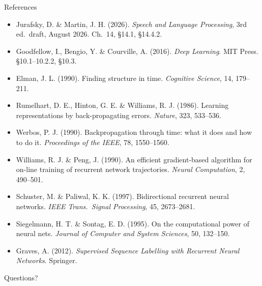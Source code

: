 \documentclass[aspectratio=169, 11pt]{beamer}
\newcommand{\nosrc}{}       %
\begin{document}
\begin{frame}[allowframebreaks]{References}
  {\scriptsize
  \begin{itemize}\itemsep0.3em
    \item Jurafsky, D. \& Martin, J. H. (2026). \emph{Speech and Language
          Processing}, 3rd ed.\ draft, August 2026. Ch.~14, \S14.1, \S14.4.2.
    \item Goodfellow, I., Bengio, Y. \& Courville, A. (2016). \emph{Deep
          Learning}. MIT Press. \S10.1--10.2.2, \S10.3.
    \item Elman, J. L. (1990). Finding structure in time. \emph{Cognitive
          Science}, 14, 179--211.
    \item Rumelhart, D. E., Hinton, G. E. \& Williams, R. J. (1986). Learning
          representations by back-propagating errors. \emph{Nature}, 323,
          533--536.
    \item Werbos, P. J. (1990). Backpropagation through time: what it does
          and how to do it. \emph{Proceedings of the IEEE}, 78, 1550--1560.
    \item Williams, R. J. \& Peng, J. (1990). An efficient gradient-based
          algorithm for on-line training of recurrent network trajectories.
          \emph{Neural Computation}, 2, 490--501.
    \item Schuster, M. \& Paliwal, K. K. (1997). Bidirectional recurrent
          neural networks. \emph{IEEE Trans.\ Signal Processing}, 45,
          2673--2681.
    \item Siegelmann, H. T. \& Sontag, E. D. (1995). On the computational
          power of neural nets. \emph{Journal of Computer and System
          Sciences}, 50, 132--150.
    \item Graves, A. (2012). \emph{Supervised Sequence Labelling with
          Recurrent Neural Networks}. Springer.
  \end{itemize}}
  \nosrc
\end{frame}

\begin{frame}[standout]
  \nosrc
  Questions?
\end{frame}
\end{document}
